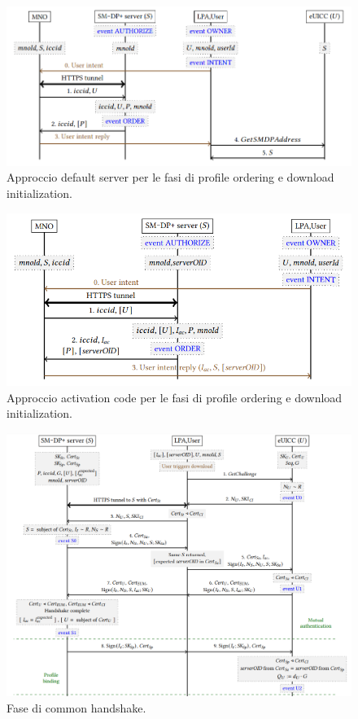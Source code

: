 \documentclass[10pt, twoside, openany]{book}
\begin{document}
\begin{figure}
\includegraphics[width=\linewidth]{default-server.png}
\caption{Approccio default server per le fasi di profile ordering e download initialization.}
\label{fig:default-server}
\end{figure}
\begin{figure}
\includegraphics[width=\linewidth]{activation-code.png}
\caption{Approccio activation code per le fasi di profile ordering e download initialization.}
\label{fig:activation-code}
\end{figure}
\begin{figure}
\includegraphics[width=\linewidth]{common-handshake.png}
\caption{Fase di common handshake.}
\label{fig:common-handshake}
\end{figure}
\end{document}
